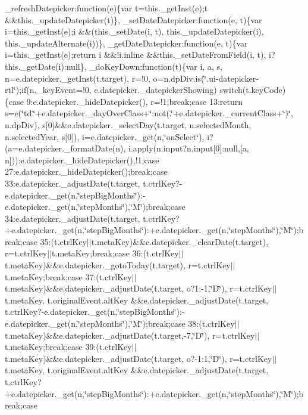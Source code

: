 \begin{DoxyCompactItemize}
\+\_\+refresh\+Datepicker\+:function(e)\{var t=this.\+\_\+get\+Inst(e);t \&\&this.\+\_\+update\+Datepicker(t)\}, \+\_\+set\+Date\+Datepicker\+:function(e, t)\{var i=this.\+\_\+get\+Inst(e);i \&\&(this.\+\_\+set\+Date(i, t), this.\+\_\+update\+Datepicker(i), this.\+\_\+update\+Alternate(i))\}, \+\_\+get\+Date\+Datepicker\+:function(e, t)\{var i=this.\+\_\+get\+Inst(e);return i \&\&!i.\+inline \&\&this.\+\_\+set\+Date\+From\+Field(i, t), i?this.\+\_\+get\+Date(i)\+:null\}, \+\_\+do\+Key\+Down\+:function(t)\{var i, a, s, n=e.\+datepicker.\+\_\+get\+Inst(t.\+target), r=!0, o=n.\+dp\+Div.\+is(\char`\"{}.\+ui-\/datepicker-\/rtl\char`\"{});if(n.\+\_\+key\+Event=!0, e.\+datepicker.\+\_\+datepicker\+Showing) switch(t.\+key\+Code)\{case 9\+:e.\+datepicker.\+\_\+hide\+Datepicker(), r=!1;break;case 13\+:return s=e(\char`\"{}td.\char`\"{}+e.\+datepicker.\+\_\+day\+Over\+Class+\char`\"{}\+:not(.\char`\"{}+e.\+datepicker.\+\_\+current\+Class+\char`\"{})\char`\"{}, n.\+dp\+Div), s\mbox{[}0\mbox{]}\&\&e.\+datepicker.\+\_\+select\+Day(t.\+target, n.\+selected\+Month, n.\+selected\+Year, s\mbox{[}0\mbox{]}), i=e.\+datepicker.\+\_\+get(n,\char`\"{}on\+Select\char`\"{}), i?(a=e.\+datepicker.\+\_\+format\+Date(n), i.\+apply(n.\+input?n.\+input\mbox{[}0\mbox{]}\+:null,\mbox{[}a, n\mbox{]}))\+:e.\+datepicker.\+\_\+hide\+Datepicker(),!1;case 27\+:e.\+datepicker.\+\_\+hide\+Datepicker();break;case 33\+:e.\+datepicker.\+\_\+adjust\+Date(t.\+target, t.\+ctrl\+Key?-\/e.\+datepicker.\+\_\+get(n,\char`\"{}step\+Big\+Months\char`\"{})\+:-\/e.\+datepicker.\+\_\+get(n,\char`\"{}step\+Months\char`\"{}),\char`\"{}\+M\char`\"{});break;case 34\+:e.\+datepicker.\+\_\+adjust\+Date(t.\+target, t.\+ctrl\+Key?+e.\+datepicker.\+\_\+get(n,\char`\"{}step\+Big\+Months\char`\"{})\+:+e.\+datepicker.\+\_\+get(n,\char`\"{}step\+Months\char`\"{}),\char`\"{}\+M\char`\"{});break;case 35\+:(t.\+ctrl\+Key$\vert$$\vert$t.\+meta\+Key)\&\&e.\+datepicker.\+\_\+clear\+Date(t.\+target), r=t.\+ctrl\+Key$\vert$$\vert$t.\+meta\+Key;break;case 36\+:(t.\+ctrl\+Key$\vert$$\vert$t.\+meta\+Key)\&\&e.\+datepicker.\+\_\+goto\+Today(t.\+target), r=t.\+ctrl\+Key$\vert$$\vert$t.\+meta\+Key;break;case 37\+:(t.\+ctrl\+Key$\vert$$\vert$t.\+meta\+Key)\&\&e.\+datepicker.\+\_\+adjust\+Date(t.\+target, o?1\+:-\/1,\char`\"{}\+D\char`\"{}), r=t.\+ctrl\+Key$\vert$$\vert$t.\+meta\+Key, t.\+original\+Event.\+alt\+Key \&\&e.\+datepicker.\+\_\+adjust\+Date(t.\+target, t.\+ctrl\+Key?-\/e.\+datepicker.\+\_\+get(n,\char`\"{}step\+Big\+Months\char`\"{})\+:-\/e.\+datepicker.\+\_\+get(n,\char`\"{}step\+Months\char`\"{}),\char`\"{}\+M\char`\"{});break;case 38\+:(t.\+ctrl\+Key$\vert$$\vert$t.\+meta\+Key)\&\&e.\+datepicker.\+\_\+adjust\+Date(t.\+target,-\/7,\char`\"{}\+D\char`\"{}), r=t.\+ctrl\+Key$\vert$$\vert$t.\+meta\+Key;break;case 39\+:(t.\+ctrl\+Key$\vert$$\vert$t.\+meta\+Key)\&\&e.\+datepicker.\+\_\+adjust\+Date(t.\+target, o?-\/1\+:1,\char`\"{}\+D\char`\"{}), r=t.\+ctrl\+Key$\vert$$\vert$t.\+meta\+Key, t.\+original\+Event.\+alt\+Key \&\&e.\+datepicker.\+\_\+adjust\+Date(t.\+target, t.\+ctrl\+Key?+e.\+datepicker.\+\_\+get(n,\char`\"{}step\+Big\+Months\char`\"{})\+:+e.\+datepicker.\+\_\+get(n,\char`\"{}step\+Months\char`\"{}),\char`\"{}\+M\char`\"{});break;case 
\end{DoxyCompactItemize}
